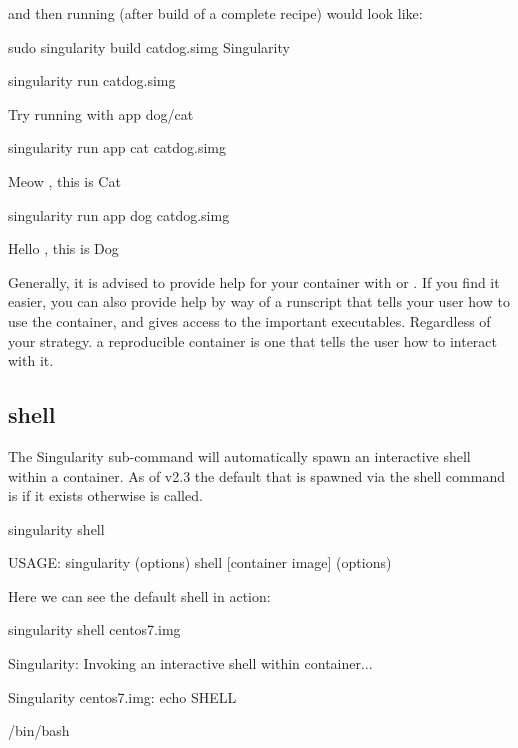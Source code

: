 \documentclass[letterpaper,10pt,english]{sphinxmanual}
\begin{document}
and then running (after build of a complete recipe) would look like:

%
\begin{sphinxVerbatim}[commandchars=\\\{\}]
sudo singularity build catdog.simg Singularity


\PYGZdl{} singularity run catdog.simg

Try running with \PYGZhy{}\PYGZhy{}app dog/cat


\PYGZdl{} singularity run \PYGZhy{}\PYGZhy{}app cat catdog.simg

Meow , this is Cat

\PYGZdl{} singularity run \PYGZhy{}\PYGZhy{}app dog catdog.simg

Hello , this is Dog
\end{sphinxVerbatim}

Generally, it is advised to provide help for your container with  or . If
you find it easier, you can also provide help by way of a runscript that
tells your user how to use the container, and gives access to the
important executables. Regardless of your strategy. a reproducible
container is one that tells the user how to interact with it.


\subsection{shell}
\label{\detokenize{appendix:id39}}\label{\detokenize{appendix:sec-shell}}
The  Singularity sub-command will automatically spawn an interactive
shell within a container. As of v2.3 the default that is spawned via the
shell command is  if it exists otherwise  is called.

%
\begin{sphinxVerbatim}[commandchars=\\\{\}]
\PYGZdl{} singularity shell

USAGE: singularity (options) shell [container image] (options)
\end{sphinxVerbatim}

Here we can see the default shell in action:

%
\begin{sphinxVerbatim}[commandchars=\\\{\}]
\PYGZdl{} singularity shell centos7.img

Singularity: Invoking an interactive shell within container...


Singularity centos7.img:\PYGZti{}\PYGZgt{} echo \PYGZdl{}SHELL

/bin/bash
\end{sphinxVerbatim}
\end{document}
